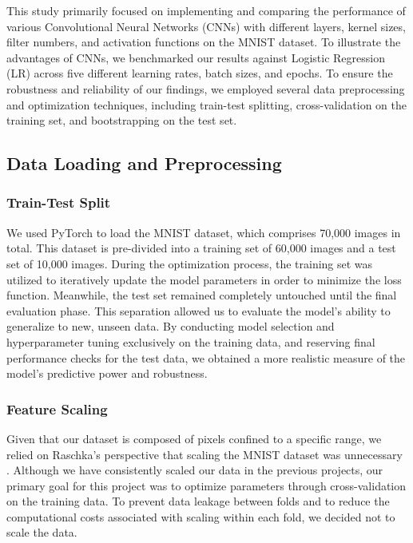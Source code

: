This study primarily focused on implementing and comparing the performance of various Convolutional Neural Networks (CNNs) with different layers, kernel sizes, filter numbers, and activation functions on the MNIST dataset. To illustrate the advantages of CNNs, we benchmarked our results against Logistic Regression (LR) across five different learning rates, batch sizes, and epochs. To ensure the robustness and reliability of our findings, we employed several data preprocessing and optimization techniques, including train-test splitting, cross-validation on the training set, and bootstrapping on the test set.                


\subsection{Data Loading and Preprocessing}

\subsubsection{Train-Test Split}

We used PyTorch to load the MNIST dataset, which comprises 70,000 images in total. This dataset is pre-divided into a training set of 60,000 images and a test set of 10,000 images. During the optimization process, the training set was utilized to iteratively update the model parameters in order to minimize the loss function. Meanwhile, the test set remained completely untouched until the final evaluation phase. This separation allowed us to evaluate the model's ability to generalize to new, unseen data. By conducting model selection and hyperparameter tuning exclusively on the training data, and reserving final performance checks for the test data, we obtained a more realistic measure of the model’s predictive power and robustness.

\subsubsection{Feature Scaling}

Given that our dataset is composed of pixels confined to a specific range, we relied on Raschka's perspective that scaling the MNIST dataset was unnecessary \cite{raschka2022machine}. Although we have consistently scaled our data in the previous projects, our primary goal for this project was to optimize parameters through cross-validation on the training data. To prevent data leakage between folds and to reduce the computational costs associated with scaling within each fold, we decided not to scale the data.

